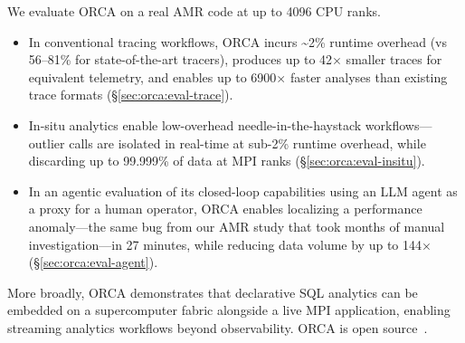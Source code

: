 
We evaluate ORCA on a real AMR code at up to 4096 CPU ranks.

\begin{itemize}[leftmargin=*]
  \item In conventional tracing workflows, ORCA incurs \textasciitilde{2}\% runtime overhead
        (vs 56--81\% for state-of-the-art tracers), produces up to 42$\times$ smaller
        traces for equivalent telemetry, and enables up to
        6900$\times$ faster analyses than existing trace formats (\S\ref{sec:orca:eval-trace}).
  \item In-situ analytics enable low-overhead needle-in-the-haystack
        workflows---outlier \mpiw{} calls are isolated in real-time at sub-2\% runtime
        overhead, while discarding up to 99.999\% of data at MPI ranks (\S\ref{sec:orca:eval-insitu}).
  \item In an agentic evaluation of its closed-loop capabilities using an LLM
        agent as a proxy for a human operator, ORCA enables localizing a performance
        anomaly---the same bug from our AMR study that took months of manual
        investigation---in 27 minutes, while reducing data volume by up to
        144$\times$ (\S\ref{sec:orca:eval-agent}).
\end{itemize}
More broadly, ORCA demonstrates that declarative SQL analytics can be embedded on a supercomputer
fabric alongside a live MPI application, enabling streaming analytics workflows beyond
observability.
ORCA is open source~\cite{Jain2026:orca-code}.

